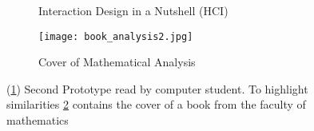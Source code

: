 \begin{figure}[h]
  \centering
  \begin{subfigure}{0.48\textwidth}
    \centering
    \todo
    \caption{Interaction Design in a Nutshell (HCI)}
    \label{fig:meta_prototype2_hci}
  \end{subfigure}
  \hspace{0.1em}
  \begin{subfigure}{0.48\textwidth}
    \centering
    \texttt{[image: book\_analysis2.jpg]}
    \caption{Cover of Mathematical Analysis}
    \label{fig:meta_prototype2_math}
  \end{subfigure}
  \caption[]{(\ref{fig:meta_prototype2_hci}) Second Prototype read by computer student. To highlight similarities \ref{fig:meta_prototype2_math} contains the cover of a book from the faculty of mathematics}
  \label{fig:meta_prototype2}
\end{figure}
